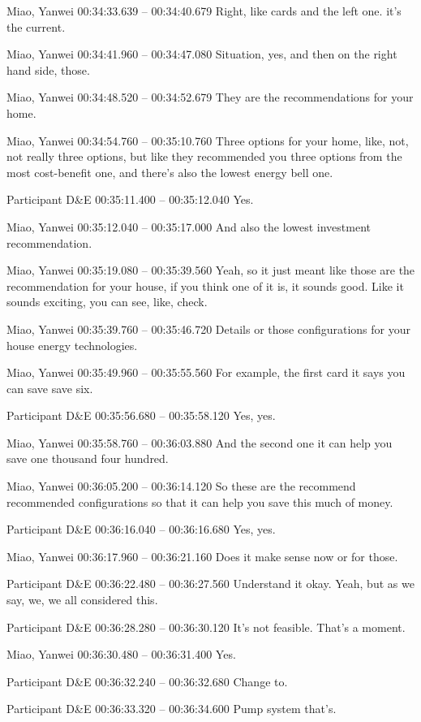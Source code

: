 {Miao, Yanwei 00:34:33.639 -- 00:34:40.679
Right, like cards and the left one. it's the current.

Miao, Yanwei 00:34:41.960 -- 00:34:47.080
Situation, yes, and then on the right hand side, those.

Miao, Yanwei 00:34:48.520 -- 00:34:52.679
They are the recommendations for your home.

Miao, Yanwei 00:34:54.760 -- 00:35:10.760
Three options for your home, like, not, not really three options, but like they recommended you three options from the most cost-benefit one, and there's also the lowest energy bell one.

Participant D\&E 00:35:11.400 -- 00:35:12.040
Yes.

Miao, Yanwei 00:35:12.040 -- 00:35:17.000
And also the lowest investment recommendation.

Miao, Yanwei 00:35:19.080 -- 00:35:39.560
Yeah, so it just meant like those are the recommendation for your house, if you think one of it is, it sounds good. Like it sounds exciting, you can see, like, check.

Miao, Yanwei 00:35:39.760 -- 00:35:46.720
Details or those configurations for your house energy technologies.

Miao, Yanwei 00:35:49.960 -- 00:35:55.560
For example, the first card it says you can save save six.

Participant D\&E 00:35:56.680 -- 00:35:58.120
Yes, yes.

Miao, Yanwei 00:35:58.760 -- 00:36:03.880
And the second one it can help you save one thousand four hundred.

Miao, Yanwei 00:36:05.200 -- 00:36:14.120
So these are the recommend recommended configurations so that it can help you save this much of money.

Participant D\&E 00:36:16.040 -- 00:36:16.680
Yes, yes.

Miao, Yanwei 00:36:17.960 -- 00:36:21.160
Does it make sense now or for those.

Participant D\&E 00:36:22.480 -- 00:36:27.560
Understand it okay. Yeah, but as we say, we, we all considered this.

Participant D\&E 00:36:28.280 -- 00:36:30.120
It's not feasible. That's a moment.

Miao, Yanwei 00:36:30.480 -- 00:36:31.400
Yes.

Participant D\&E 00:36:32.240 -- 00:36:32.680
Change to.

Participant D\&E 00:36:33.320 -- 00:36:34.600
Pump system that's.

}

